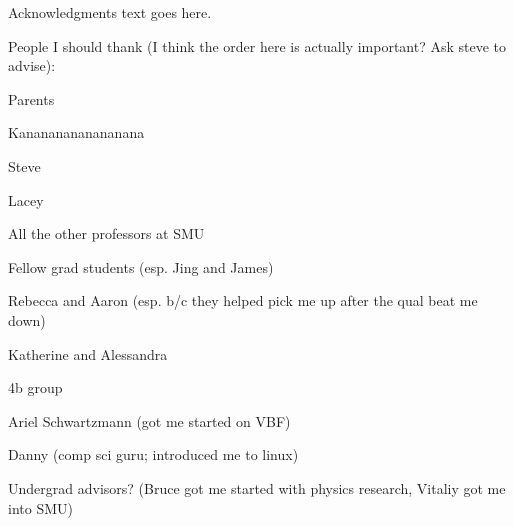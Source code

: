 Acknowledgments text goes here.

People I should thank (I think the order here is actually important? Ask steve to advise):

Parents

Kanananananananana

Steve

Lacey

All the other professors at SMU

Fellow grad students (esp. Jing and James)

Rebecca and Aaron (esp. b/c they helped pick me up after the qual beat me down)

Katherine and Alessandra

4b group

Ariel Schwartzmann (got me started on VBF)

Danny (comp sci guru; introduced me to linux)

Undergrad advisors? (Bruce got me started with physics research, Vitaliy got me into SMU)

